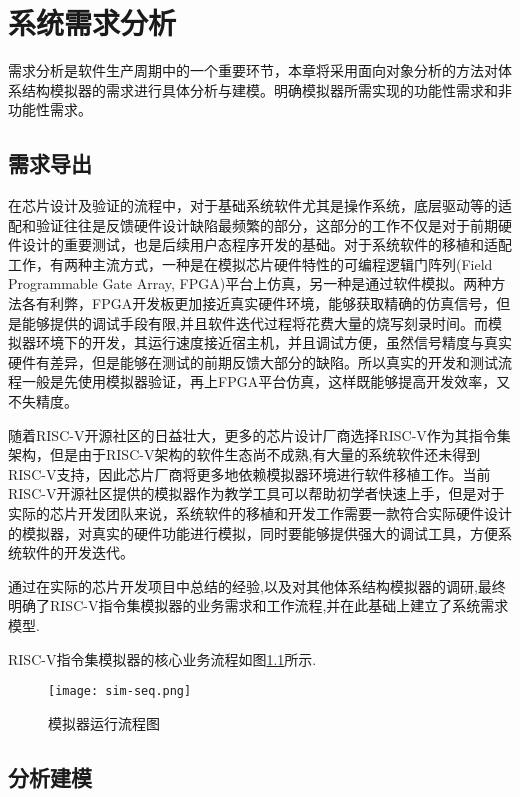 
\chapter{系统需求分析}

需求分析是软件生产周期中的一个重要环节，本章将采用面向对象分析的方法对体系结构模拟器的需求进行具体分析与建模。明确模拟器所需实现的功能性需求和非功能性需求。

\section{需求导出}

在芯片设计及验证的流程中，对于基础系统软件尤其是操作系统，底层驱动等的适配和验证往往是反馈硬件设计缺陷最频繁的部分，这部分的工作不仅是对于前期硬件设计的重要测试，也是后续用户态程序开发的基础。对于系统软件的移植和适配工作，有两种主流方式，一种是在模拟芯片硬件特性的可编程逻辑门阵列(Field Programmable Gate Array, FPGA)平台上仿真，另一种是通过软件模拟。两种方法各有利弊，FPGA开发板更加接近真实硬件环境，能够获取精确的仿真信号，但是能够提供的调试手段有限,并且软件迭代过程将花费大量的烧写刻录时间。而模拟器环境下的开发，其运行速度接近宿主机，并且调试方便，虽然信号精度与真实硬件有差异，但是能够在测试的前期反馈大部分的缺陷。所以真实的开发和测试流程一般是先使用模拟器验证，再上FPGA平台仿真，这样既能够提高开发效率，又不失精度。


随着RISC-V开源社区的日益壮大，更多的芯片设计厂商选择RISC-V作为其指令集架构，但是由于RISC-V架构的软件生态尚不成熟,有大量的系统软件还未得到RISC-V支持，因此芯片厂商将更多地依赖模拟器环境进行软件移植工作。当前RISC-V开源社区提供的模拟器作为教学工具可以帮助初学者快速上手，但是对于实际的芯片开发团队来说，系统软件的移植和开发工作需要一款符合实际硬件设计的模拟器，对真实的硬件功能进行模拟，同时要能够提供强大的调试工具，方便系统软件的开发迭代。


通过在实际的芯片开发项目中总结的经验,以及对其他体系结构模拟器的调研,最终明确了RISC-V指令集模拟器的业务需求和工作流程,并在此基础上建立了系统需求模型.


RISC-V指令集模拟器的核心业务流程如图\ref{fig:sim-seq}所示.
\begin{figure}[H]
  \centering
  \texttt{[image: sim-seq.png]}
  \caption{模拟器运行流程图}
  \label{fig:sim-seq}
\end{figure}


\section{分析建模}


